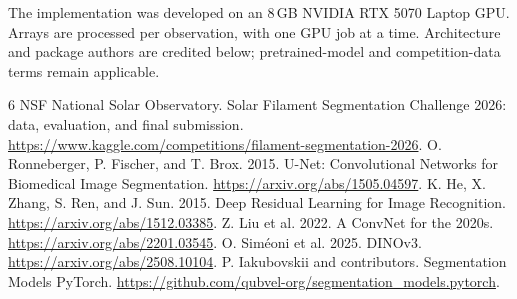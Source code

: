 \documentclass[sigconf,nonacm]{acmart}
\begin{document}
The implementation was developed on an 8\,GB NVIDIA RTX 5070 Laptop GPU.
Arrays are processed per observation, with one GPU job at a time.
Architecture and package authors are credited below; pretrained-model and
competition-data terms remain applicable.

\begin{thebibliography}{6}
 NSF National Solar Observatory. Solar Filament
Segmentation Challenge 2026: data, evaluation, and final submission.
\url{https://www.kaggle.com/competitions/filament-segmentation-2026}.
 O. Ronneberger, P. Fischer, and T. Brox. 2015.
U-Net: Convolutional Networks for Biomedical Image Segmentation.
\url{https://arxiv.org/abs/1505.04597}.
 K. He, X. Zhang, S. Ren, and J. Sun. 2015.
Deep Residual Learning for Image Recognition.
\url{https://arxiv.org/abs/1512.03385}.
 Z. Liu et al. 2022. A ConvNet for the 2020s.
\url{https://arxiv.org/abs/2201.03545}.
 O. Sim\'eoni et al. 2025. DINOv3.
\url{https://arxiv.org/abs/2508.10104}.
 P. Iakubovskii and contributors. Segmentation Models PyTorch.
\url{https://github.com/qubvel-org/segmentation_models.pytorch}.
\end{thebibliography}
\end{document}
